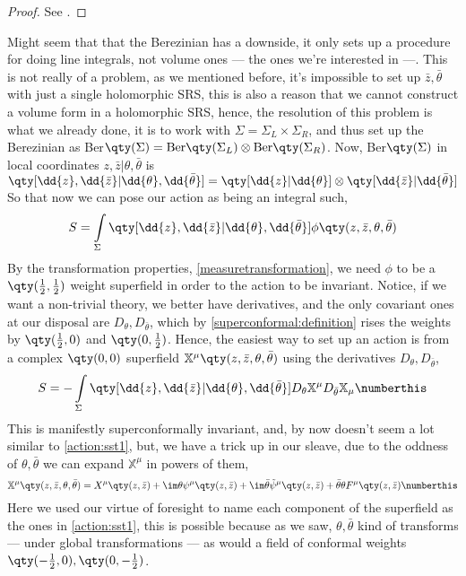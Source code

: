 \begin{proof} See \cite{witten:integration}.\end{proof}
Might seem that that the Berezinian has a downside, it only sets up a procedure for doing line integrals, not volume ones --- 
the ones we're interested in ---. This is not really of a problem, as we mentioned before, it's impossible to set up $\bar z,\bar\theta$ 
with just a single holomorphic SRS, this is also a reason that we cannot construct a volume form in a holomorphic SRS, hence, 
the resolution of this problem is what we already done, it is to work with $\Sigma=\Sigma_L\times\Sigma_R$, and thus set up 
the Berezinian as Ber$\qty(\Sigma)=\textnormal{Ber}\qty(\Sigma_L)\otimes\textnormal{Ber}\qty(\Sigma_R)$. Now, Ber$\qty(\Sigma)$ 
in local coordinates $z,\bar z|\theta,\bar\theta$ is $\qty[\dd{z},\dd{\bar z}|\dd{\theta},\dd{\bar\theta}]=\qty[\dd{z}|\dd{\theta}]\otimes\qty[\dd{\bar z}|\dd{\bar\theta}]$ So 
that now we can pose our action as being an integral such, \[S=\int\limits_\Sigma\qty[\dd{z},\dd{\bar z}|\dd{\theta},\dd{\bar\theta}]\phi\qty(z,\bar z,\theta,\bar\theta)\] 
By the transformation properties, \cref{measuretransformation}, we need $\phi$ to be a $\qty(\frac12,\frac12)$ weight superfield in order to 
the action to be invariant. Notice, if we want a non-trivial theory, we better have derivatives, and the only covariant ones at our disposal are 
$D_\theta,D_{\bar\theta}$, which by \cref{superconformal:definition} rises the weights by $\qty(\frac12,0)$ and $\qty(0,\frac12)$. 
Hence, the easiest way to set up an action is from a complex $\qty(0,0)$ superfield $\mathbb X^\mu\qty(z,\bar z,\theta,\bar\theta)$ 
using the derivatives $D_\theta,D_{\bar\theta}$, \[S=-\int\limits_\Sigma\qty[\dd{z},\dd{\bar z}|\dd{\theta},\dd{\bar\theta}]D_\theta \mathbb X^\mu D_{\bar\theta}\mathbb X_\mu\numberthis\label{action:srssst1}\] 
This is manifestly superconformally invariant, and, by now doesn't seem a lot similar to \cref{action:sst1}, but, we have a trick up in our sleave, 
due to the oddness of $\theta,\bar\theta$ we can expand $\mathbb X^\mu$ in powers of them,
\[\mathbb X^\mu\qty(z,\bar z,\theta,\bar\theta)=X^\mu\qty(z,\bar z)+\im\theta\psi^\mu\qty(z,\bar z)+\im\bar\theta{\tilde\psi}^\mu\qty(z,\bar z)+\bar\theta\theta F^\mu\qty(z,\bar z)\numberthis\label{xdecomposition}\]
Here we used our virtue of foresight to name each component of the superfield as the ones in \cref{action:sst1}, this is possible because as 
we saw, $\theta,\bar\theta$ kind of transforms --- under global transformations --- as would a field of conformal weights $\qty(-\frac12,0),\qty(0,-\frac12)$. 
